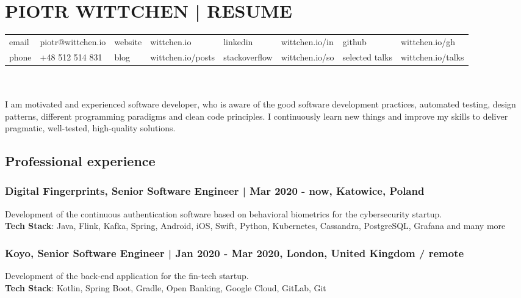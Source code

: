 \documentclass[8pt]{extarticle}
\begin{document}
  \small

  \section*{\large{PIOTR WITTCHEN | RESUME}}

  \begin{tabular}{llllllll}
      email  & piotr@wittchen.io & website  & wittchen.io       & linkedin      & wittchen.io/in & github         & wittchen.io/gh    \\
      phone  & +48 512 514 831   & blog     & wittchen.io/posts & stackoverflow & wittchen.io/so & selected talks & wittchen.io/talks \\
  \end{tabular} \\ \\

    I am motivated and experienced software developer, who is aware of the good software development practices, automated testing,
    design patterns, different programming paradigms and clean code principles. I continuously learn new things
    and improve my skills to deliver pragmatic, well-tested, high-quality solutions.

    \subsection*{\normalsize{Professional experience}}

      \subsubsection*{\normalsize{Digital Fingerprints, Senior Software Engineer | Mar 2020 - now, Katowice, Poland}}
      Development of the continuous authentication software based on behavioral biometrics for the cybersecurity startup.\\
      \textbf{Tech Stack}: Java, Flink, Kafka, Spring, Android, iOS, Swift, Python, Kubernetes, Cassandra, PostgreSQL, Grafana and many more

      \subsubsection*{\normalsize{Koyo, Senior Software Engineer | Jan 2020 - Mar 2020, London, United Kingdom / remote}}
      Development of the back-end application for the fin-tech startup.\\
      \textbf{Tech Stack}: Kotlin, Spring Boot, Gradle, Open Banking, Google Cloud, GitLab, Git
\end{document}
